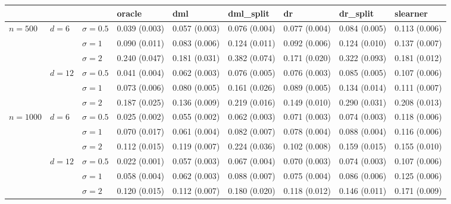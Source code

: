 \documentclass[11pt]{article} %
\theoremstyle{theorem}  %
\theoremstyle{plain}
\begin{document}
\begin{figure}[H]
\scriptsize
\centering
\begin{tabular}{lllllllll}
\toprule
         &        &            &         oracle &            dml &     dml\_split &             dr &      dr\_split &       slearner \\
\midrule
\multirow{6}{*}{$n=500$} & \multirow{3}{*}{$d=6$} & $\sigma=0.5$ &  0.039 (0.003) &  0.057 (0.003) &  0.076 (0.004) &  0.077 (0.004) &  0.084 (0.005) &  0.113 (0.006) \\
         &        & $\sigma=1$ &  0.090 (0.011) &  0.083 (0.006) &  0.124 (0.011) &  0.092 (0.006) &  0.124 (0.010) &  0.137 (0.007) \\
         &        & $\sigma=2$ &  0.240 (0.047) &  0.181 (0.031) &  0.382 (0.074) &  0.171 (0.020) &  0.322 (0.093) &  0.181 (0.012) \\
\cline{2-9}
         & \multirow{3}{*}{$d=12$} & $\sigma=0.5$ &  0.041 (0.004) &  0.062 (0.003) &  0.076 (0.005) &  0.076 (0.003) &  0.085 (0.005) &  0.107 (0.006) \\
         &        & $\sigma=1$ &  0.073 (0.006) &  0.080 (0.005) &  0.161 (0.026) &  0.089 (0.005) &  0.134 (0.014) &  0.111 (0.007) \\
         &        & $\sigma=2$ &  0.187 (0.025) &  0.136 (0.009) &  0.219 (0.016) &  0.149 (0.010) &  0.290 (0.031) &  0.208 (0.013) \\
\cline{1-9}
\cline{2-9}
\multirow{6}{*}{$n=1000$} & \multirow{3}{*}{$d=6$} & $\sigma=0.5$ &  0.025 (0.002) &  0.055 (0.002) &  0.062 (0.003) &  0.071 (0.003) &  0.074 (0.003) &  0.118 (0.006) \\
         &        & $\sigma=1$ &  0.070 (0.017) &  0.061 (0.004) &  0.082 (0.007) &  0.078 (0.004) &  0.088 (0.004) &  0.116 (0.006) \\
         &        & $\sigma=2$ &  0.112 (0.015) &  0.119 (0.007) &  0.224 (0.036) &  0.102 (0.008) &  0.159 (0.015) &  0.155 (0.010) \\
\cline{2-9}
         & \multirow{3}{*}{$d=12$} & $\sigma=0.5$ &  0.022 (0.001) &  0.057 (0.003) &  0.067 (0.004) &  0.070 (0.003) &  0.074 (0.003) &  0.107 (0.006) \\
         &        & $\sigma=1$ &  0.058 (0.004) &  0.062 (0.003) &  0.088 (0.007) &  0.075 (0.004) &  0.086 (0.006) &  0.125 (0.006) \\
         &        & $\sigma=2$ &  0.120 (0.015) &  0.112 (0.007) &  0.180 (0.020) &  0.118 (0.012) &  0.146 (0.011) &  0.171 (0.009) \\

\end{tabular}
\end{figure}
\end{document}

